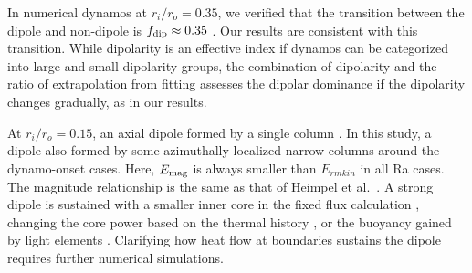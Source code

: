 In numerical dynamos at $r_i/r_o = 0.35$, we verified that the transition between the dipole and non-dipole is $f_{\rm dip} \approx 0.35$ \cite{Uli:2006,Olson:2011}.
Our results are consistent with this transition. 
While dipolarity is an effective index if dynamos can be categorized into large and small dipolarity groups, the combination of dipolarity and the ratio of extrapolation from fitting assesses the dipolar dominance if the dipolarity changes gradually, as in our results.

At $r_i/r_o =0.15$, an axial dipole formed by a single column \cite{Heimpel:2005}. 
In this study, a dipole also formed by some azimuthally localized narrow columns around the dynamo-onset cases. 
Here, $E_{\rm mag}$ is always smaller than $E_{rm kin}$ in all Ra cases. 
The magnitude relationship is the same as that of Heimpel et al.\ . 
A strong dipole is sustained with a smaller inner core in the fixed flux calculation \cite{Hori:2010}, changing the core power based on the thermal history \cite{Driscoll:2016}, or the buoyancy gained by light elements \cite{(Lhuillier:2019}.
Clarifying how heat flow at boundaries sustains the dipole requires further numerical simulations.

